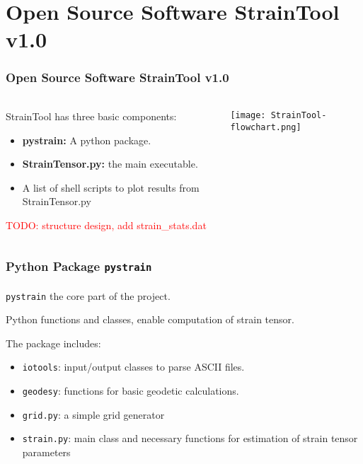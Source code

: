 \section{Open Source Software \textbf{StrainTool v1.0}}
 
\graphicspath{{Chapter2/Figs/}}

\begin{frame}
  \frametitle{Open Source Software \textbf{StrainTool v1.0}}
  \framesubtitle{}
  \label{ch2:straintool}
  
  \begin{columns}
    \begin{column}{0.5\textwidth}
      StrainTool has three basic components:
      \begin{itemize}
        \item \textbf{pystrain:} A python package.
        \item \textbf{StrainTensor.py:} the main executable.
        \item A list of shell scripts to plot results from StrainTensor.py
      \end{itemize}
      \textcolor{red}{TODO: structure design, add strain\_stats.dat}
    \end{column}
    \begin{column}{0.5\textwidth}
      \texttt{[image: StrainTool-flowchart.png]} 
    \end{column}
  \end{columns}
\end{frame}
\note{}


\begin{frame}
  \frametitle{Python Package \texttt{pystrain}}
  \framesubtitle{}
  \label{ch2:}
  
  \texttt{pystrain} the core part of the project.
  
  Python functions and classes, enable computation of strain tensor.
  
  The package includes:
  \begin{itemize}
    \item \texttt{iotools}: input/output classes to parse ASCII files.
    \item \texttt{geodesy}: functions for basic geodetic calculations.
    \item \texttt{grid.py}: a simple grid generator
    \item \texttt{strain.py}: main class and necessary functions for estimation of strain  tensor parameters
  \end{itemize}
  
  

\end{frame}
\note{}


